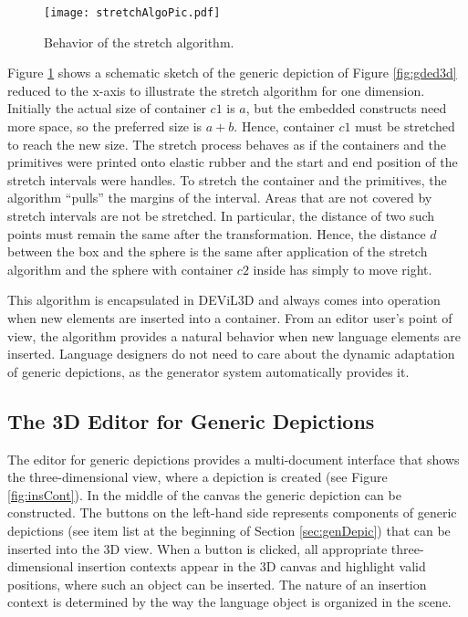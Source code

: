 \documentclass[a4paper]{article}
\newcommand{\dev}{DEViL3D\xspace}
\begin{document}
\begin{figure}[!ht]
  \centering
  \texttt{[image: stretchAlgoPic.pdf]}
  \caption{Behavior of the stretch algorithm.}
  \label{fig:stretchAlgoPic}
\end{figure}

Figure \ref{fig:stretchAlgoPic} shows a schematic sketch of the generic depiction of Figure \ref{fig:gded3d} reduced to the $\mathrm{x}$-axis to illustrate the stretch algorithm for one dimension. Initially the actual size of container $c1$ is $a$, but the embedded constructs need more space, so the preferred size is $a+b$. Hence, container $c1$ must be stretched to reach the new size. The stretch process behaves as if the containers and the primitives were printed onto elastic rubber and the start and end position of the stretch intervals were handles. To stretch the container and the primitives, the algorithm ``pulls'' the margins of the interval. Areas that are not covered by stretch intervals are not be stretched. In particular, the distance of two such points must remain the same after the transformation. Hence, the distance $d$ between the box and the sphere is the same after application of the stretch algorithm and the sphere with container $c2$ inside has simply to move right.

This algorithm is encapsulated in \dev and always comes into operation when new elements are inserted into a container. From an editor user's point of view, the algorithm provides a natural behavior when new language elements are inserted. Language designers do not need to care about the dynamic adaptation of generic depictions, as the generator system automatically provides it.

\subsection{The 3D Editor for Generic Depictions}
\label{subsec:genDepicEditor}
The editor for generic depictions provides a multi-document interface that shows the three-dimensional view, where a depiction is created (see Figure \ref{fig:insCont}). In the middle of the canvas the generic depiction can be constructed. The buttons on the left-hand side represents components of generic depictions (see item list at the beginning of Section \ref{sec:genDepic}) that can be inserted into the 3D view. When a button is clicked, all appropriate three-dimensional insertion contexts appear in the 3D canvas and highlight valid positions, where such an object can be inserted. The nature of an insertion context is determined by the way the language object is organized in the scene.
\end{document}
